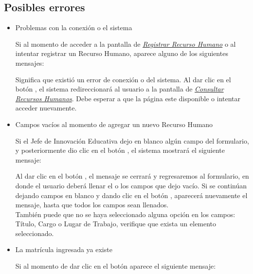         \subsection{Posibles errores}
            \begin{itemize}
<<<<<<< HEAD
=======
            
            	\item Problemas con la conexión o el sistema
                
                	Si al momento de acceder a la pantalla de \hyperlink{registrarrh}{\textit{Registrar Recurso Humano}} o al intentar registrar un Recurso Humano, aparece alguno de los siguientes mensajes:
                
                	Significa que existió un error de conexión o del sistema. Al dar clic en el botón , el sistema redireccionará al usuario a la pantalla de \hyperlink{consultarrh}{\textit{Consultar Recursos Humanos}}. Debe esperar a que la página este disponible o intentar acceder nuevamente.
                
            	\item Campos vacíos al momento de agregar un nuevo Recurso Humano
            
                	Si el Jefe de Innovación Educativa dejo en blanco algún campo del formulario, y posteriormente dio clic en el botón , el sistema mostrará el siguiente mensaje:
                
                	Al dar clic en el botón , el mensaje se cerrará y regresaremos al formulario, en donde el usuario deberá llenar el o los campos que dejo vacío. Si se continúan dejando campos en blanco y dando clic en el botón , aparecerá nuevamente el mensaje, hasta que todos los campos sean llenados.\\
                
                	También puede que no se haya seleccionado alguna opción en los campos: Título, Cargo o Lugar de Trabajo, verifique que exista un elemento seleccionado.
                
            	\item La matrícula ingresada ya existe
            
                	Si al momento de dar clic en el botón  aparece el siguiente mensaje:
            

\end{itemize}
